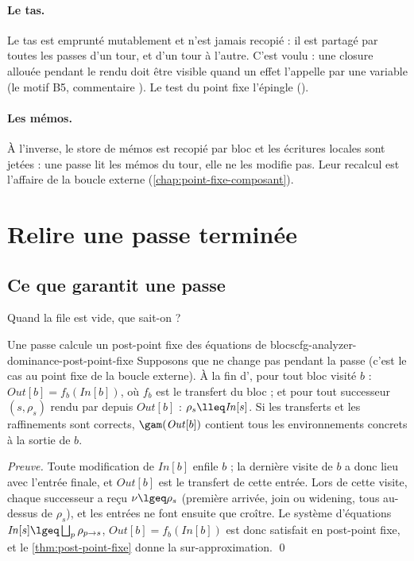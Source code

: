\paragraph{Le tas.} Le tas est emprunté mutablement et n'est jamais recopié :
il est partagé par toutes les passes d'un tour, et d'un tour à l'autre. C'est
voulu : une closure allouée pendant le rendu doit être visible quand un effet
l'appelle par une variable (le motif B5, commentaire
). Le test
 du point fixe l'épingle
().

\paragraph{Les mémos.} À l'inverse, le store de mémos est recopié par bloc et
les écritures locales sont jetées : une passe lit les mémos du tour, elle ne
les modifie pas. Leur recalcul est l'affaire de la boucle externe
(\cref{chap:point-fixe-composant}).

\section{Relire une passe terminée}
\label{sec:cfg-analyzer-dominance-relire}

\subsection{Ce que garantit une passe}

Quand la file est vide, que sait-on ?

\begin{proposition}{Une passe calcule un post-point fixe des équations de blocs}{cfg-analyzer-dominance-post-point-fixe}
  Supposons que  ne change pas pendant la passe (c'est le cas
  au point fixe de la boucle externe). À la fin d', pour
  tout bloc visité $b$ : $\mathit{Out}[b] = f_b(\mathit{In}[b])$, où $f_b$
  est le transfert du bloc ; et pour tout successeur $(s, \rho_s)$ rendu par
   depuis $\mathit{Out}[b]$ : $\rho_s \lleq \mathit{In}[s]$.
  Si les transferts et les raffinements sont corrects, $\gam(\mathit{Out}[b])$
  contient tous les environnements concrets à la sortie de $b$.
\end{proposition}

\noindent\emph{Preuve.} Toute modification de $\mathit{In}[b]$ enfile $b$ ;
la dernière visite de $b$ a donc lieu avec l'entrée finale, et
$\mathit{Out}[b]$ est le transfert de cette entrée. Lors de cette visite,
chaque successeur a reçu $\nu \lgeq \rho_s$ (première arrivée, join ou
widening, tous au-dessus de $\rho_s$), et les entrées ne font ensuite que
croître. Le système d'équations $\mathit{In}[s] \lgeq
\bigsqcup_{p} \rho_{p \to s}$, $\mathit{Out}[b] = f_b(\mathit{In}[b])$ est
donc satisfait en post-point fixe, et le \cref{thm:post-point-fixe} donne la
sur-approximation. \qed


